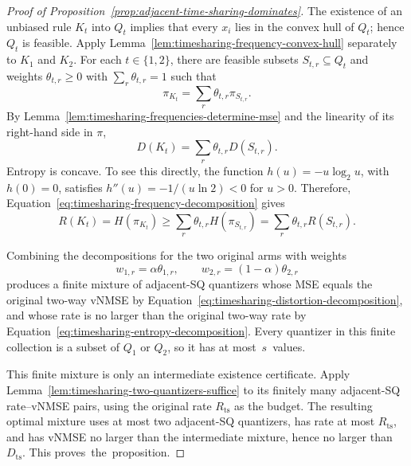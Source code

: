 \documentclass[11pt,letterpaper]{article}
\begin{document}
{\begin{proof}[Proof of Proposition~\ref{prop:adjacent-time-sharing-dominates}]
The existence of an unbiased rule $K_t$ into $Q_t$ implies that every
$x_i$ lies in the convex hull of $Q_t$; hence $Q_t$ is feasible. Apply Lemma~\ref{lem:timesharing-frequency-convex-hull} separately to $K_1$ and
$K_2$. For each $t\in\{1,2\}$, there are feasible subsets $S_{t,r}\subseteq Q_t$ and weights $\theta_{t,r}\ge0$ with
$\sum_r\theta_{t,r}=1$ such that
\begin{equation}
\pi_{K_t}=\sum_r\theta_{t,r}\pi_{S_{t,r}}.
\label{eq:timesharing-frequency-decomposition}
\end{equation}
By Lemma~\ref{lem:timesharing-frequencies-determine-mse} and the linearity of
its right-hand side in $\pi$,
\begin{equation}
D(K_t)=\sum_r\theta_{t,r}D(S_{t,r}).
\label{eq:timesharing-distortion-decomposition}
\end{equation}
Entropy is concave. To see this directly, the function
$h(u)=-u\log_2u$, with $h(0)=0$, satisfies
$h''(u)=-1/(u\ln2)<0$ for $u>0$. Therefore,
Equation~\eqref{eq:timesharing-frequency-decomposition} gives
\begin{equation}
R(K_t)=H(\pi_{K_t})
\ge\sum_r\theta_{t,r}H(\pi_{S_{t,r}})
=\sum_r\theta_{t,r}R(S_{t,r}).
\label{eq:timesharing-entropy-decomposition}
\end{equation}

Combining the decompositions for the two original arms with weights
\[
w_{1,r}=\alpha\theta_{1,r},
\qquad
w_{2,r}=(1-\alpha)\theta_{2,r}
\]
produces a finite mixture of adjacent-SQ quantizers whose MSE equals the
original two-way vNMSE by
Equation~\eqref{eq:timesharing-distortion-decomposition}, and whose rate is no
larger than the original two-way rate by
Equation~\eqref{eq:timesharing-entropy-decomposition}. Every quantizer in this
finite collection is a subset of $Q_1$ or $Q_2$, so it has at \mbox{most $s$ values.}

This finite mixture is only an intermediate existence certificate. Apply
Lemma~\ref{lem:timesharing-two-quantizers-suffice} to its finitely many
adjacent-SQ rate--vNMSE pairs, using the original rate $R_{\mathrm{ts}}$ as the
budget. The resulting optimal mixture uses at most two adjacent-SQ quantizers,
has rate at most $R_{\mathrm{ts}}$, and has vNMSE no larger than the intermediate
mixture, hence no larger than $D_{\mathrm{ts}}$. This \mbox{proves the proposition.}
\end{proof}

}
\end{document}
